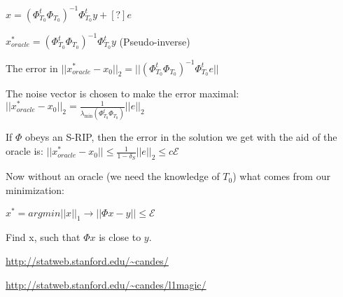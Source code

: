 \documentclass[12pt,letterpaper]{report}
\begin{document}
$x = (\Phi_{T_0}^t \Phi_{T_0})^{-1} \Phi_{T_0}^t y + [?]e$

$x_{oracle}^* = (\Phi_{T_0}^t \Phi_{T_0})^{-1}\Phi_{T_0}^t y$ (Pseudo-inverse)

The error in $||x_{oracle}^* - x_0||_2 = ||(\Phi_{T_0}^t \Phi_{T_0})^{-1} \Phi_{T_0}^t e||$

The noise vector is chosen to make the error maximal: $||x_{oracle}^* - x_0||_2 = \frac{1}{\lambda_{\min}(\Phi_{T_0}^t \Phi_{T_0})}||e||_2$

If $\Phi$ obeys an S-RIP, then the error in the solution we get with the aid of the oracle is: $||x_{oracle}^* - x_0|| \leq \frac{1}{1 - \delta_S}||e||_2 \leq c  \mathcal{E}$

Now without an oracle (we need the knowledge of $T_0$) what comes from our minimization:

$x^* = argmin||x||_1 \rightarrow ||\Phi x - y|| \leq \mathcal{E}$

Find x, such that $\Phi x$ is close to $y$.

\url{http://statweb.stanford.edu/~candes/}

\url{http://statweb.stanford.edu/~candes/l1magic/}
\end{document}
